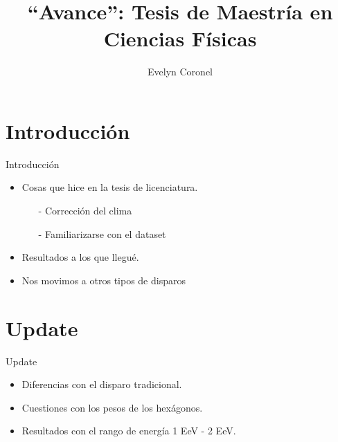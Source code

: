 \documentclass{beamer}
\title[Avance]{``Avance'': Tesis de Maestría en Ciencias Físicas}
\author{Evelyn Coronel}
\institute{Partículas y Campos - Centro Atómico Bariloche}
\begin{document}
\begin{frame}
  \titlepage
\end{frame}


\section{Introducción}

\begin{frame}{Introducción}

\begin{itemize}
  \item Cosas que hice en la tesis de licenciatura.
  \begin{itemize}
  	\item[-] Corrección del clima
  	\item[-] Familiarizarse con el dataset
  \end{itemize}
  \item Resultados a los que llegué.
  \item Nos movimos a otros tipos de disparos
\end{itemize}

\vskip 1cm


\end{frame}

\section{Update}

\begin{frame}{Update}

  \begin{itemize}
  	\item Diferencias con el disparo tradicional.
  	\item Cuestiones con los pesos de los hexágonos.
  	\item Resultados con el rango de energía 1 EeV - 2 EeV.
  \end{itemize}


\end{frame}
\end{document}
